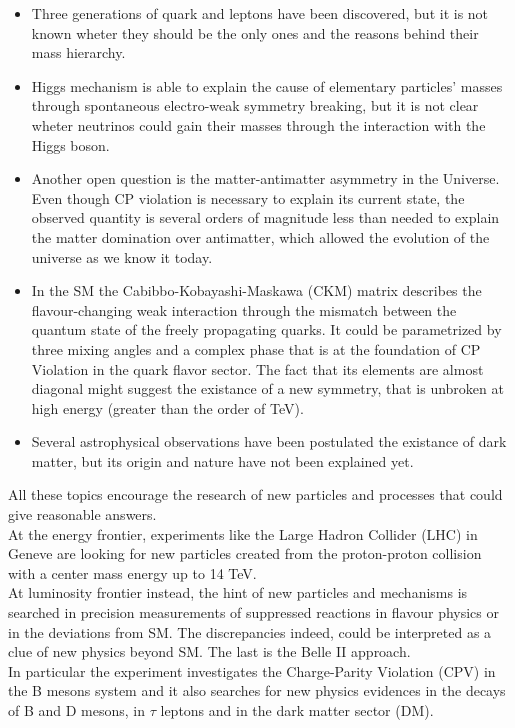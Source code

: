 \begin{itemize}
\item Three generations of quark and leptons have been discovered, but it is not known wheter they should be the only ones and the reasons behind their mass hierarchy.
\item Higgs mechanism is able to explain the cause of elementary particles' masses through spontaneous electro-weak symmetry breaking, but it is not clear wheter neutrinos could gain their masses through the interaction with the Higgs boson.
\item Another open question is the matter-antimatter asymmetry in the Universe. Even though CP violation is necessary to explain its current state, the observed quantity is several orders of magnitude less than needed to explain the matter domination over antimatter, which allowed the evolution of the universe as we know it today.
\item In the SM the Cabibbo-Kobayashi-Maskawa (CKM) matrix describes the flavour-changing weak interaction through the mismatch between the quantum state of the freely propagating quarks. It could be parametrized by three mixing angles and a complex phase that is at the foundation of CP Violation in the quark flavor sector. The fact that its elements are almost diagonal might suggest the existance of a new symmetry, that is unbroken at high energy (greater than the order of TeV).
\item Several astrophysical observations have been postulated the existance of dark matter, but its origin and nature have not been explained yet.
\end{itemize}

All these topics encourage the research of new particles and processes that could give reasonable answers.\\
At the energy frontier, experiments like the Large Hadron Collider (LHC) in Geneve are looking for new particles created from the proton-proton collision with a center mass energy up to 14 TeV.\\
At luminosity frontier instead, the hint of new particles and mechanisms is searched in precision measurements of suppressed reactions in flavour physics or in the deviations from SM. The discrepancies indeed, could be interpreted as a clue of new physics beyond SM. The last is the Belle II approach.\\


In particular the experiment investigates the Charge-Parity Violation (CPV) in the B mesons system and it also searches for new physics evidences in the decays of B and D mesons, in $\tau$ leptons and in the dark matter sector (DM).

